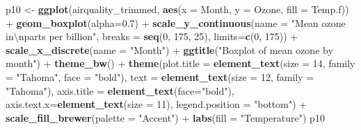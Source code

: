 \documentclass[]{article}
\newenvironment{Shaded}{\begin{snugshade}}{\end{snugshade}}
\newcommand{\KeywordTok}[1]{\textcolor[rgb]{0.13,0.29,0.53}{\textbf{{#1}}}}
\newcommand{\DataTypeTok}[1]{\textcolor[rgb]{0.13,0.29,0.53}{{#1}}}
\newcommand{\DecValTok}[1]{\textcolor[rgb]{0.00,0.00,0.81}{{#1}}}
\newcommand{\FloatTok}[1]{\textcolor[rgb]{0.00,0.00,0.81}{{#1}}}
\newcommand{\CharTok}[1]{\textcolor[rgb]{0.31,0.60,0.02}{{#1}}}
\newcommand{\StringTok}[1]{\textcolor[rgb]{0.31,0.60,0.02}{{#1}}}
\newcommand{\NormalTok}[1]{{#1}}
\begin{document}
\begin{Shaded}
\begin{Highlighting}[]
\NormalTok{p10 <-}\StringTok{ }\KeywordTok{ggplot}\NormalTok{(airquality_trimmed, }\KeywordTok{aes}\NormalTok{(}\DataTypeTok{x =} \NormalTok{Month, }\DataTypeTok{y =} \NormalTok{Ozone, }\DataTypeTok{fill =} \NormalTok{Temp.f)) +}\StringTok{ }
\StringTok{        }\KeywordTok{geom_boxplot}\NormalTok{(}\DataTypeTok{alpha=}\FloatTok{0.7}\NormalTok{) +}
\StringTok{        }\KeywordTok{scale_y_continuous}\NormalTok{(}\DataTypeTok{name =} \StringTok{"Mean ozone in}\CharTok{\textbackslash{}n}\StringTok{parts per billion"}\NormalTok{,}
                           \DataTypeTok{breaks =} \KeywordTok{seq}\NormalTok{(}\DecValTok{0}\NormalTok{, }\DecValTok{175}\NormalTok{, }\DecValTok{25}\NormalTok{),}
                           \DataTypeTok{limits=}\KeywordTok{c}\NormalTok{(}\DecValTok{0}\NormalTok{, }\DecValTok{175}\NormalTok{)) +}
\StringTok{        }\KeywordTok{scale_x_discrete}\NormalTok{(}\DataTypeTok{name =} \StringTok{"Month"}\NormalTok{) +}
\StringTok{        }\KeywordTok{ggtitle}\NormalTok{(}\StringTok{"Boxplot of mean ozone by month"}\NormalTok{) +}
\StringTok{        }\KeywordTok{theme_bw}\NormalTok{() +}
\StringTok{        }\KeywordTok{theme}\NormalTok{(}\DataTypeTok{plot.title =} \KeywordTok{element_text}\NormalTok{(}\DataTypeTok{size =} \DecValTok{14}\NormalTok{, }\DataTypeTok{family =} \StringTok{"Tahoma"}\NormalTok{, }\DataTypeTok{face =} \StringTok{"bold"}\NormalTok{), }
              \DataTypeTok{text =} \KeywordTok{element_text}\NormalTok{(}\DataTypeTok{size =} \DecValTok{12}\NormalTok{, }\DataTypeTok{family =} \StringTok{"Tahoma"}\NormalTok{),}
              \DataTypeTok{axis.title =} \KeywordTok{element_text}\NormalTok{(}\DataTypeTok{face=}\StringTok{"bold"}\NormalTok{),}
              \DataTypeTok{axis.text.x=}\KeywordTok{element_text}\NormalTok{(}\DataTypeTok{size =} \DecValTok{11}\NormalTok{),}
              \DataTypeTok{legend.position =} \StringTok{"bottom"}\NormalTok{) +}
\StringTok{        }\KeywordTok{scale_fill_brewer}\NormalTok{(}\DataTypeTok{palette =} \StringTok{"Accent"}\NormalTok{) +}
\StringTok{        }\KeywordTok{labs}\NormalTok{(}\DataTypeTok{fill =} \StringTok{"Temperature"}\NormalTok{)}
\NormalTok{p10}
\end{Highlighting}
\end{Shaded}
\end{document}
